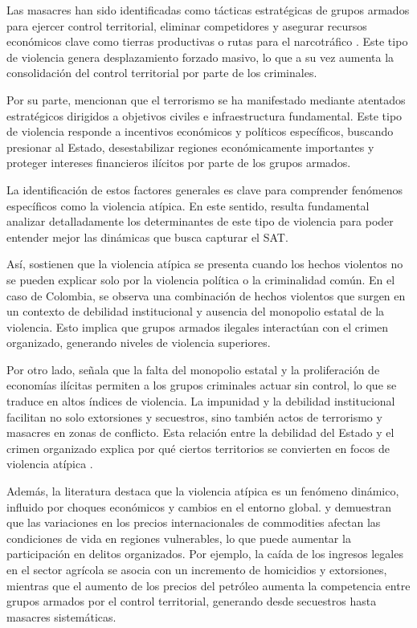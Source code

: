 Las masacres han sido identificadas como tácticas estratégicas de grupos armados para ejercer control territorial, eliminar competidores y asegurar recursos económicos clave como tierras productivas o rutas para el narcotráfico \citet{feldmann2009}. Este tipo de violencia genera desplazamiento forzado masivo, lo que a su vez aumenta la consolidación del control territorial por parte de los criminales.

Por su parte, \citet{feldmann2009} mencionan que el terrorismo se ha manifestado mediante atentados estratégicos dirigidos a objetivos civiles e infraestructura fundamental. Este tipo de violencia responde a incentivos económicos y políticos específicos, buscando presionar al Estado, desestabilizar regiones económicamente importantes y proteger intereses financieros ilícitos por parte de los grupos armados.

La identificación de estos factores generales es clave para comprender fenómenos específicos como la violencia atípica. En este sentido, resulta fundamental analizar detalladamente los determinantes de este tipo de violencia para poder entender mejor las dinámicas que busca capturar el SAT.

Así, \citet{deas1995} sostienen que la violencia atípica se presenta cuando los hechos violentos no se pueden explicar solo por la violencia política o la criminalidad común. En el caso de Colombia, se observa una combinación de hechos violentos que surgen en un contexto de debilidad institucional y ausencia del monopolio estatal de la violencia. Esto implica que grupos armados ilegales interactúan con el crimen organizado, generando niveles de violencia superiores.

Por otro lado, \citet{rubio1999} señala que la falta del monopolio estatal y la proliferación de economías ilícitas permiten a los grupos criminales actuar sin control, lo que se traduce en altos índices de violencia. La impunidad y la debilidad institucional facilitan no solo extorsiones y secuestros, sino también actos de terrorismo y masacres en zonas de conflicto. Esta relación entre la debilidad del Estado y el crimen organizado explica por qué ciertos territorios se convierten en focos de violencia atípica \citet{rubio1999, sanchez2001violent}.

Además, la literatura destaca que la violencia atípica es un fenómeno dinámico, influido por choques económicos y cambios en el entorno global. \citet{acemoglu2013} y \citet{angrist2008} demuestran que las variaciones en los precios internacionales de commodities afectan las condiciones de vida en regiones vulnerables, lo que puede aumentar la participación en delitos organizados. Por ejemplo, la caída de los ingresos legales en el sector agrícola se asocia con un incremento de homicidios y extorsiones, mientras que el aumento de los precios del petróleo aumenta la competencia entre grupos armados por el control territorial, generando desde secuestros hasta masacres sistemáticas.

